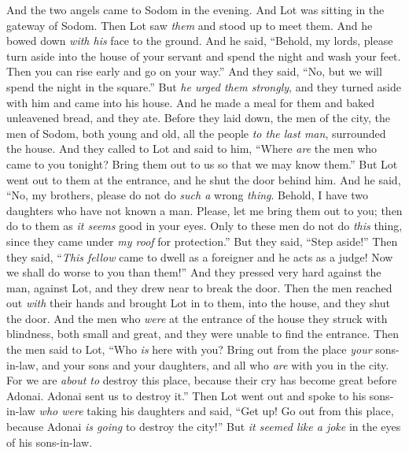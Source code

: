 \begin{biblechapter} %
 And the two angels came to Sodom in the evening. And Lot was sitting in the gateway of Sodom. Then Lot saw \textit{them} and stood up to meet them. And he bowed down \textit{with his} face to the ground.
\verse And he said, “Behold, my lords, please turn aside into the house of your servant and spend the night and wash your feet. Then you can rise early and go on your way.” And they said, “No, but we will spend the night in the square.”
\verse But \textit{he urged them strongly}, and they turned aside with him and came into his house. And he made a meal for them and baked unleavened bread, and they ate.
\verse Before they laid down, the men of the city, the men of Sodom, both young and old, all the people \textit{to the last man}, surrounded the house.
\verse And they called to Lot and said to him, “Where \textit{are} the men who came to you tonight? Bring them out to us so that we may know them.”
\verse But Lot went out to them at the entrance, and he shut the door behind him.
\verse And he said, “No, my brothers, please do not do \textit{such a} wrong \textit{thing}.
\verse Behold, I have two daughters who have not known a man. Please, let me bring them out to you; then do to them as \textit{it seems} good in your eyes. Only to these men do not do \textit{this} thing, since they came under\textit{ my roof} for protection.”
\verse But they said, “Step aside!” Then they said, “\textit{This fellow} came to dwell as a foreigner and he acts as a judge! Now we shall do worse to you than them!” And they pressed very hard against the man, against Lot, and they drew near to break the door.
\verse Then the men reached out \textit{with} their hands and brought Lot in to them, into the house, and they shut the door.
\verse And the men who \textit{were} at the entrance of the house they struck with blindness, both small and great, and they were unable to find the entrance.
\verse Then the men said to Lot, “Who \textit{is} here with you? Bring out from the place \textit{your} sons-in-law, and your sons and your daughters, and all who \textit{are} with you in the city.
\verse For we are \textit{about to} destroy this place, because their cry has become great before Adonai. Adonai sent us to destroy it.”
\verse Then Lot went out and spoke to his sons-in-law \textit{who were} taking his daughters and said, “Get up! Go out from this place, because Adonai \textit{is going} to destroy the city!” But \textit{it seemed like a joke} in the eyes of his sons-in-law.

\end{biblechapter}
